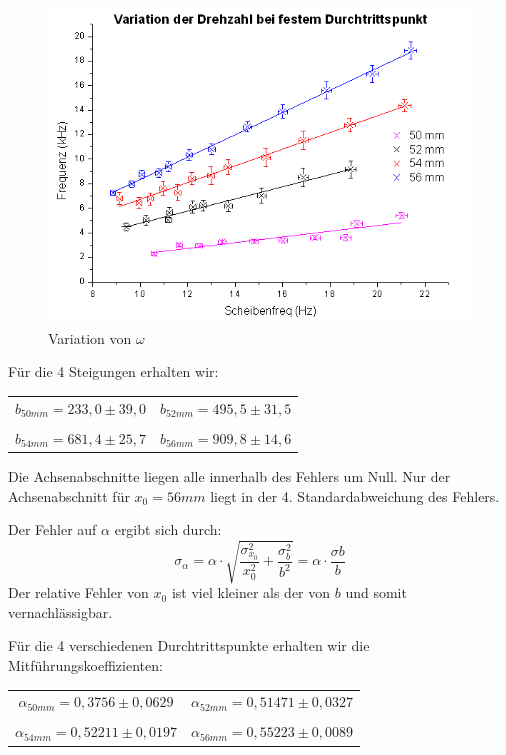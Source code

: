 \begin{figure}[H]
	\centering \includegraphics[width = \textwidth]{Bilder/graph2.jpg}
	\caption{Variation von $\omega$}
\end{figure}




Für die 4 Steigungen erhalten wir:

\begin{center}
\begin{tabular}[H]{c c}
	$b_{50mm} = 233,0 \pm 39,0 $ & $b_{52mm} = 495,5 \pm 31,5$\\
	 & \\
	$b_{54mm} = 681,4 \pm 25,7 $ & $b_{56mm} = 909,8 \pm 14,6$
\end{tabular}
\end{center}

Die Achsenabschnitte liegen alle innerhalb des Fehlers um Null. Nur der Achsenabschnitt für $x_0 = 56mm$ liegt in der 4. Standardabweichung des Fehlers.

Der Fehler auf $\alpha$ ergibt sich durch:
$$\sigma_\alpha = \alpha\cdot\sqrt{\frac{\sigma^2_{x_0}}{x_0^2}+\frac{\sigma_b^2}{b^2}} = \alpha\cdot\frac{\sigma{b}}{b}$$
Der relative Fehler von $x_0$ ist viel kleiner als der von $b$ und somit vernachlässigbar.

Für die 4 verschiedenen Durchtrittspunkte erhalten wir die Mitführungskoeffizienten:


\begin{center}
\begin{tabular}[H]{c c}
	$\alpha_{50mm} = 0,3756 \pm 0,0629 $ & $\alpha_{52mm} = 0,51471 \pm 0,0327$\\
	 & \\
	$\alpha_{54mm} = 0,52211 \pm 0,0197 $ & $\alpha_{56mm} = 0,55223 \pm 0,0089$
\end{tabular}
\end{center}

